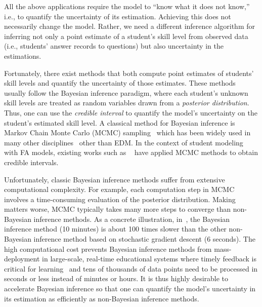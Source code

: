 All the above applications require the model to ``know what it does not know,''
i.e., to quantify the uncertainty of its estimation. Achieving this does not
necessarily change the model. Rather, we need a different inference algorithm
for inferring not only a point estimate of a student's skill level from observed
data (i.e., students' answer records to questions) but also uncertainty in the
estimations.

Fortunately, there exist methods that both compute point estimates of students'
skill levels and quantify the uncertainty of those estimates. These methods
usually follow the Bayesian inference paradigm, where each student's unknown
skill levels are treated as random variables drawn from a \textit{posterior
    distribution}. Thus, one can use the \textit{credible interval} to quantify the
model's uncertainty on the student's estimated skill level. A classical method
for Bayesian inference is Markov Chain Monte Carlo (MCMC)
sampling~\cite{gelman2013bayesian} which has been widely used in many other
disciplines~\cite{gilks1995markov} other than EDM. In the context of student
modeling with FA models, existing works such as
~\cite{lan14a,fox2010bayesian,pardos2010using,merkle2011comparison} have
applied MCMC methods to obtain credible intervals.

Unfortunately, classic Bayesian inference methods suffer from extensive
computational complexity. For example, each computation step in MCMC involves a
time-consuming evaluation of the posterior distribution. Making matters worse,
MCMC typically takes many more steps to converge than non-Bayesian inference
methods. As a concrete illustration, in~\cite{lan14a}, the Bayesian inference
method (10 minutes) is about 100 times slower than the other non-Bayesian
inference method based on stochastic gradient descent (6 seconds). The high
computational cost prevents Bayesian inference methods from mass-deployment in
large-scale, real-time educational systems where timely feedback is critical
for learning~\cite{driscoll1994psychology} and tens of thousands of data points
need to be processed in seconds or less instead of minutes or hours. It is thus
highly desirable to accelerate Bayesian inference so that one can quantify
the model's uncertainty in its estimation as efficiently as non-Bayesian inference
methods.
%

